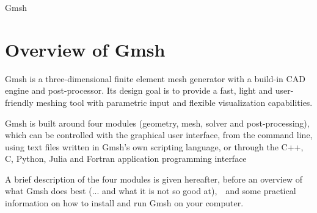 \documentclass[dvipdfmx, 9pt, a4paper]{article}
\numberwithin{equation}{section}
\begin{document}
\begin{center}
{\fontsize{18pt}{1pt}\selectfont Gmsh}\\
\end{center}
\section{Overview of Gmsh}
Gmsh is a three-dimensional finite element mesh generator with a build-in CAD engine and post-processor. Its design goal is to provide a fast, light and user-friendly meshing tool with parametric input and flexible visualization capabilities.\par
Gmsh is built around four modules (geometry, mesh, solver and post-processing), which can be controlled with the graphical user interface,  from the command line, using text files written in Gmsh's own scripting language, or through the C++, C, Python, Julia and Fortran application programming interface\par
A brief description of the four modules is given hereafter, before an overview of what Gmsh does best (... and what it is not so good at),　and some practical information on how to install and run Gmsh on your computer.
\end{document}
